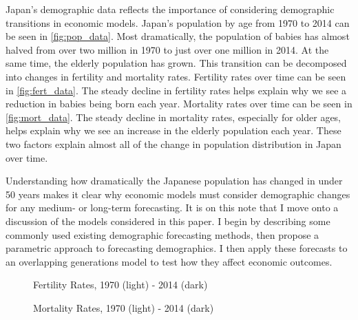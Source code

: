 \documentclass[10pt]{article}
\numberwithin{equation}{subsection}
\newcommand*{\FigureDir}{../../graphs}
\begin{document}
\par Japan's demographic data reflects the importance of considering demographic transitions in economic models. Japan's population by age from 1970 to 2014 can be seen in \autoref{fig:pop_data}. Most dramatically, the population of babies has almost halved from over two million in 1970 to just over one million in 2014. At the same time, the elderly population has grown. This transition can be decomposed into changes in fertility and mortality rates. Fertility rates over time can be seen in \autoref{fig:fert_data}. The steady decline in fertility rates helps explain why we see a reduction in babies being born each year. Mortality rates over time can be seen in \autoref{fig:mort_data}. The steady decline in mortality rates, especially for older ages, helps explain why we see an increase in the elderly population each year. These two factors explain almost all of the change in population distribution in Japan over time.

\par Understanding how dramatically the Japanese population has changed in under 50 years makes it clear why economic models must consider demographic changes for any \mbox{medium-} or long-term forecasting. It is on this note that I move onto a discussion of the models considered in this paper. I begin by describing some commonly used existing demographic forecasting methods, then propose a parametric approach to forecasting demographics. I then apply these forecasts to an overlapping generations model to test how they affect economic outcomes.

\begin{figure}[!ht]
   \centering
   \caption{\label{fig:fert_data}Fertility Rates, 1970 (light) - 2014 (dark)}
\end{figure}

\begin{figure}[!ht]
   \centering
   \caption{\label{fig:mort_data}Mortality Rates, 1970 (light) - 2014 (dark)}
\end{figure}
\end{document}
